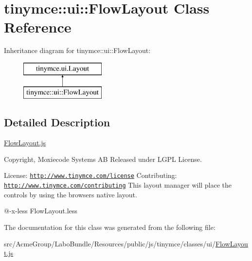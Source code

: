 \hypertarget{classtinymce_1_1ui_1_1_flow_layout}{\section{tinymce\+:\+:ui\+:\+:Flow\+Layout Class Reference}
\label{classtinymce_1_1ui_1_1_flow_layout}
}
Inheritance diagram for tinymce\+:\+:ui\+:\+:Flow\+Layout\+:\begin{figure}[H]
\begin{center}
\leavevmode
\includegraphics[height=2.000000cm]{classtinymce_1_1ui_1_1_flow_layout}
\end{center}
\end{figure}


\subsection{Detailed Description}
\hyperlink{_flow_layout_8js}{Flow\+Layout.\+js}

Copyright, Moxiecode Systems A\+B Released under L\+G\+P\+L License.

License\+: \href{http://www.tinymce.com/license}{\tt http\+://www.\+tinymce.\+com/license} Contributing\+: \href{http://www.tinymce.com/contributing}{\tt http\+://www.\+tinymce.\+com/contributing} This layout manager will place the controls by using the browsers native layout.

@-\/x-\/less Flow\+Layout.\+less 

The documentation for this class was generated from the following file\+:\begin{DoxyCompactItemize}
\item 
src/\+Acme\+Group/\+Labo\+Bundle/\+Resources/public/js/tinymce/classes/ui/\hyperlink{_flow_layout_8js}{Flow\+Layout.\+js}\end{DoxyCompactItemize}
